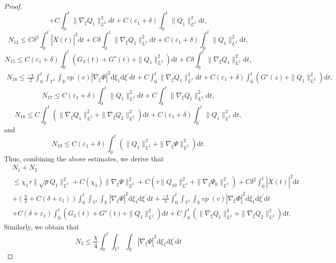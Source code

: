 \documentclass[10pt,reqno]{amsart}
\numberwithin{equation}{section}
\newcommand{\dif}{\mathrm{d}}
\newcommand{\ddiv}{\mathrm{div}}
\begin{document}
\begin{proof}
\[+C\int_0^t\|\nabla_\xi Q_1\|_{L^2}^2\dif t
+C(\varepsilon_1+\delta)\int_0^t\| Q_1\|_{L^2}^2\dif t,
\]
\[
N_{14}\le C\delta^2\int_0^t|\dot X(t)|^2\dif t+C\delta\int_0^t\|\nabla_\xi Q_1\|_{L^2}^2\dif t
+C(\varepsilon_1+\delta)\int_0^t\| Q_1\|_{L^2}^2\dif t,
\]
\[
N_{15}\le C(\varepsilon_1+\delta)\int_0^t\left(G_3(t)+G^s(t)+\| Q_1\|_{L^2}^2\right)\dif t+C\delta\int_0^t\|\nabla_\xi Q_1\|_{L^2}^2\dif t,
\]
\begin{align*}
N_{16}
    \le \frac{-\chi}{2}\int_0^t\int_{\mathbb{T}^2}\int_{\mathbb{R}}vp^\prime(v)|\nabla_\xi\Phi|^2\dif \xi_1\dif \xi^{\prime}\dif t
    +C\int_0^t\|\nabla_\xi Q_1\|_{L^2}^2\dif t
    +C(\varepsilon_1+\delta)\int_0^t\left(G^s(z)+\| Q_1\|_{L^2}^2\right)\dif t,
  \end{align*}
\[
 N_{17} \le C(\varepsilon_1+\delta)\int_0^t\| Q_1\|_{L^2}^2\dif t
 +C\int_0^t\|\nabla_\xi Q_1\|_{L^2}^2\dif t,
\]
\[
  N_{18} \le C\int_0^t\left(\|\nabla_\xi Q_1\|_{L^2}^2+\|\nabla_\xi Q_2\|_{L^2}^2\right)\dif t
  +C(\varepsilon_1+\delta)\int_0^t\| Q_1\|_{L^2}^2\dif t,
\]
and
\[
N_{19}\le C(\varepsilon_1+\delta)\int_0^t\left(\| Q_1\|_{L^2}^2+\|\nabla_\xi \Psi\|_{L^2}^2\right)\dif t.
\]
Thus, combining the above estimates, we derive that
\begin{equation}\label{n1}
\begin{aligned}
&N_1+N_2\\&
\le \chi_1\tau\|\sqrt\rho Q_{1}\|_{L^2}^2+C(\chi_1)\|\nabla_\xi\Psi\|_{L^2}^2
+C(\tau\|Q_{10}\|_{L^2}^2+\|\nabla_\xi\Psi_0\|_{L^2}^2)
+C\delta^2\int_0^t|\dot X(t)|^2\dif t\\
&
+(\frac{\chi}{2}+C(\delta+\varepsilon_1))\int_0^t\int_{\mathbb{T}^2}\int_{\mathbb{R}}|\nabla_\xi\Psi|^2\dif \xi_1\dif \xi^{\prime}\dif t
+\frac{-\chi}{4}\int_0^t\int_{\mathbb{T}^2}\int_{\mathbb{R}}vp^\prime(v)|\nabla_\xi\Phi|^2\dif \xi_1\dif \xi^{\prime}\dif t\\
&+C(\delta+\varepsilon_1)\int_0^t\left(G_3(t)+G^s(t)+\|Q_1\|_{L^2}^2\right)\dif t
+C\int_0^t\left(\|\nabla_\xi Q_1\|_{L^2}^2+\|\nabla_\xi Q_2\|_{L^2}^2\right)\dif t.
\end{aligned}
\end{equation}
Similarly, we obtain that
\begin{equation}\label{n3}
N_3\le \frac{\chi}{4}\int_0^t\int_{\mathbb{T}^2}\int_{\mathbb{R}}|\nabla_\xi\Psi|^2\dif \xi_1\dif \xi^{\prime}\dif t

\end{equation}
\end{proof}
\end{document}
